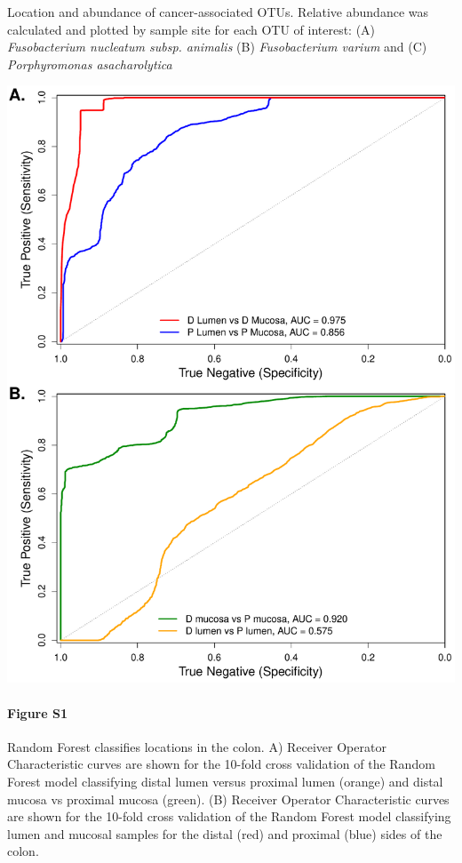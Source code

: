 \documentclass[11pt,]{article}
\let\oldparagraph\paragraph
\renewcommand{\paragraph}[1]{\oldparagraph{#1}\mbox{}}
\begin{document}
Location and abundance of cancer-associated OTUs. Relative abundance was
calculated and plotted by sample site for each OTU of interest: (A)
\emph{Fusobacterium nucleatum subsp. animalis} (B) \emph{Fusobacterium
varium} and (C) \emph{Porphyromonas asacharolytica}

\newpage

\includegraphics{../submission/figure_S1.pdf}

\paragraph{Figure S1}\label{figure-s1}

Random Forest classifies locations in the colon. A) Receiver Operator
Characteristic curves are shown for the 10-fold cross validation of the
Random Forest model classifying distal lumen versus proximal lumen
(orange) and distal mucosa vs proximal mucosa (green). (B) Receiver
Operator Characteristic curves are shown for the 10-fold cross
validation of the Random Forest model classifying lumen and mucosal
samples for the distal (red) and proximal (blue) sides of the colon.
\end{document}
